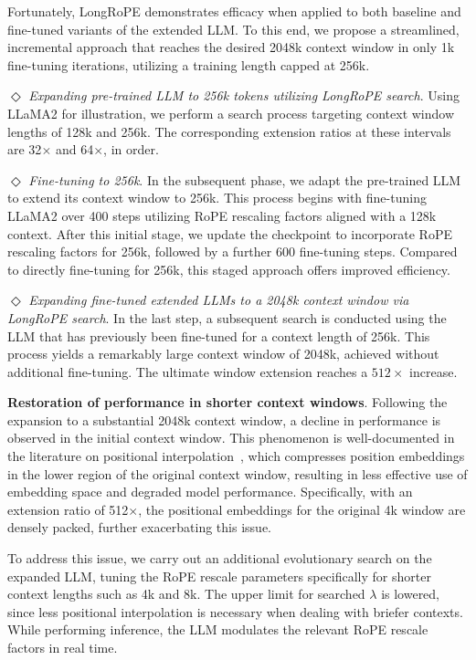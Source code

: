 Fortunately, LongRoPE demonstrates efficacy when applied to both baseline and fine-tuned variants of the extended LLM. To this end, we propose a streamlined, incremental approach that reaches the desired 2048k context window in only 1k fine-tuning iterations, utilizing a training length capped at 256k.

$\Diamond$ \textit{Expanding pre-trained LLM to 256k tokens utilizing LongRoPE search}. Using LLaMA2 for illustration, we perform a search process targeting context window lengths of 128k and 256k. The corresponding extension ratios at these intervals are 32$\times$ and 64$\times$, in order.

$\Diamond$ \textit{Fine-tuning to 256k}. In the subsequent phase, we adapt the pre-trained LLM to extend its context window to 256k. This process begins with fine-tuning LLaMA2 over 400 steps utilizing RoPE rescaling factors aligned with a 128k context. After this initial stage, we update the checkpoint to incorporate RoPE rescaling factors for 256k, followed by a further 600 fine-tuning steps. Compared to directly fine-tuning for 256k, this staged approach offers improved efficiency.

$\Diamond$ \textit{Expanding fine-tuned extended LLMs to a 2048k context window via LongRoPE search}. In the last step, a subsequent search is conducted using the LLM that has previously been fine-tuned for a context length of 256k. This process yields a remarkably large context window of 2048k, achieved without additional fine-tuning. The ultimate window extension reaches a $512\times$ increase.

\textbf{Restoration of performance in shorter context windows}. Following the expansion to a substantial 2048k context window, a decline in performance is observed in the initial context window. This phenomenon is well-documented in the literature on positional interpolation~\cite{pi}, which compresses position embeddings in the lower region of the original context window, resulting in less effective use of embedding space and degraded model performance. Specifically, with an extension ratio of 512$\times$, the positional embeddings for the original 4k window are densely packed, further exacerbating this issue.

To address this issue, we carry out an additional evolutionary search on the expanded LLM, tuning the RoPE rescale parameters specifically for shorter context lengths such as 4k and 8k. The upper limit for searched $\lambda$ is lowered, since less positional interpolation is necessary when dealing with briefer contexts. While performing inference, the LLM modulates the relevant RoPE rescale factors in real time.

